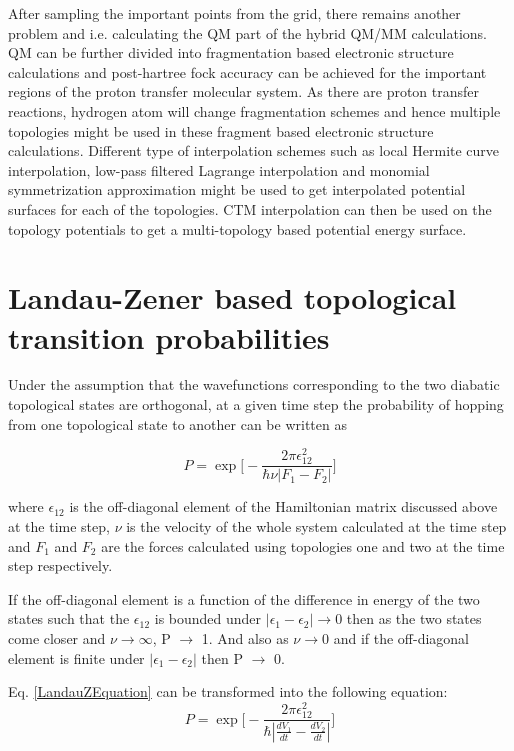 After sampling
the important points from the grid, there remains another problem and i.e. calculating
the QM part of the hybrid QM/MM calculations. QM can be further divided into
fragmentation based electronic structure calculations and post-hartree fock
accuracy can be achieved for the important regions of the proton transfer molecular
system. As there are proton transfer reactions, hydrogen atom will change fragmentation
schemes and hence multiple topologies might be used in these fragment based electronic
structure calculations. Different type of interpolation schemes such as local Hermite
curve interpolation, low-pass filtered Lagrange interpolation and monomial symmetrization
approximation might be used to get interpolated potential surfaces for each of the
topologies. CTM interpolation can then be used on the topology potentials to get a
multi-topology based potential energy surface.

\section{Landau-Zener based topological transition probabilities} 
Under the assumption that the wavefunctions corresponding to the two diabatic topological states
are orthogonal, at a given time step the probability of hopping from one topological state to another can be written
as

\begin{equation}
\label{LandauZEquation}
P = \exp\bigg[-\frac{2\pi\epsilon_{12}^{2}}{\hbar\nu|F_{1}-F_{2}|}\bigg]
\end{equation}

where $\epsilon_{12}$ is the off-diagonal element of the Hamiltonian matrix discussed above at the time step, $\nu$
is the velocity of the whole system calculated at the time step and $F_{1}$ and $F_{2}$ are the forces calculated
using topologies one and two at the time step respectively.

If the off-diagonal element is a function of the difference in energy of the two states such that 
the $\epsilon_{12}$ is bounded under $|\epsilon_{1} - \epsilon_{2}| \rightarrow 0$ then as the two
states come closer and $\nu \rightarrow \infty$, P $\rightarrow$ 1. And also as $\nu \rightarrow 0$
and if the off-diagonal element is finite under $|\epsilon_{1}-\epsilon_{2}|$ 
then P $\rightarrow$ 0.

Eq. \ref{LandauZEquation} can be transformed into the following equation:
\begin{equation}
P = \exp\bigg[-\frac{2\pi\epsilon_{12}^{2}}{\hbar|\frac{dV_{1}}{dt}-\frac{dV_{2}}{dt}|}\bigg]
\end{equation}

